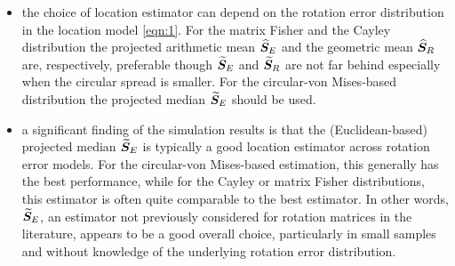 \begin{itemize}
\item the choice of location estimator can depend on the rotation error distribution in the location model \eqref{eqn:1}.  For the matrix Fisher and the Cayley distribution  the projected arithmetic mean ${\widehat{\bm S}_E}$ and the geometric mean ${\widehat{\bm S}_R}$ are, respectively, preferable though ${\widetilde{\bm S}_E}$ and ${\widetilde{\bm S}_R}$ are not far behind especially when the circular spread is smaller. For the circular-von Mises-based distribution  the projected median ${\widetilde{\bm S}_E}$  should be used.

\item   a significant finding of the simulation results is that the (Euclidean-based)  projected median ${\widetilde{\bm S}_E}$ is typically a good location estimator across rotation error models.  For the circular-von Mises-based estimation, this generally has the best performance, while for the Cayley or matrix Fisher distributions, this estimator is often quite comparable to the best estimator.  In other words, ${\widetilde{\bm S}_E}$, an estimator not previously considered for rotation matrices in the literature, appears to be a good overall choice, particularly in small samples and without knowledge of the underlying rotation error distribution.


\end{itemize}
